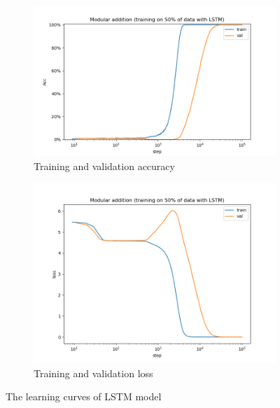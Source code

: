 \begin{figure}[!ht]
    \centering
    \begin{subfigure}{0.45\textwidth}
        \centering
        \includegraphics[width=\linewidth]{fig/grokking_curves/addition_50_LSTM_step.png}
        \caption{Training and validation accuracy}
        \label{fig:grokking_curve_LSTM}
    \end{subfigure}
    \begin{subfigure}{0.45\textwidth}
        \centering
        \includegraphics[width=\linewidth]{fig/loss_curves/addition_50_LSTM_step.png}
        \caption{Training and validation loss}
        \label{fig:loss_curve_LSTM}
    \end{subfigure}

    \caption{The learning curves of LSTM model}
    \label{fig:acc_and_loss_LSTM}
\end{figure}

